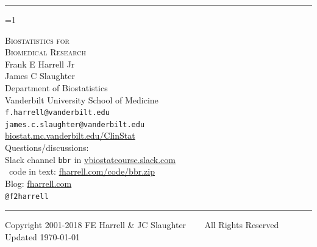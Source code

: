 \documentclass{report}
\begin{document}
\author{ }

\noindent\rule{\linewidth}{1mm}

\def\originalBBR{1}  %
\ifnum\originalBBR=1

\begin{flushright}
\Huge
\textsc{Biostatistics for\\Biomedical Research}\\[2ex]
\huge Frank E Harrell Jr \\ James C Slaughter \\
\Large
Department of Biostatistics \\
Vanderbilt University School of Medicine \\
\texttt{f.harrell@vanderbilt.edu} \\ \texttt{james.c.slaughter@vanderbilt.edu}
\\[2ex] \href{http://biostat.mc.vanderbilt.edu/wiki/Main/ClinStat}{biostat.mc.vanderbilt.edu/ClinStat}\\
Questions/discussions:\\Slack channel \texttt{bbr} in 
\href{http://vbiostatcourse.slack.com}{vbiostatcourse.slack.com}\\
\R\ code in text: \href{http://fharrell.com/code/bbr.zip}{fharrell.com/code/bbr.zip}\\
Blog: \href{http://fharrell.com}{fharrell.com}\\
{\smaller \verb|@f2harrell|}
\\[2ex]
\small
\end{flushright}
\rule{\linewidth}{1mm}
\begin{center}
\vspace{.5in}
\small
Copyright 2001-2018 FE Harrell \& JC Slaughter ~~~ All Rights Reserved
\\ \hfill \scriptsize Updated \today
\end{center}

\else %
\end{document}
